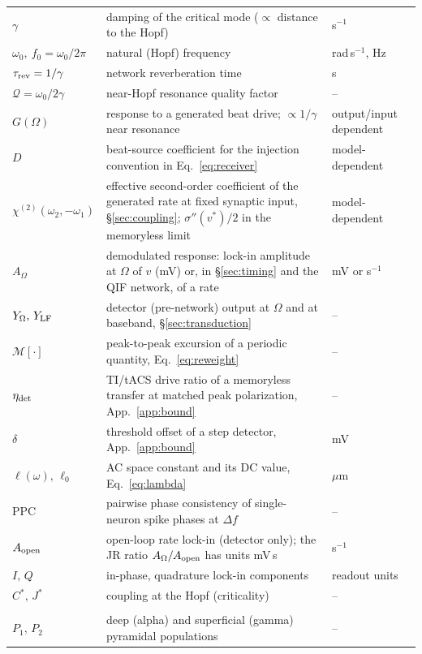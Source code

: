 \documentclass[11pt,a4paper]{article}
\newcommand{\Sig}{\sigma}
\begin{document}
{\begin{longtable}{@{}>{\raggedright\arraybackslash}p{} >{\raggedright\arraybackslash}p{} >{\raggedright\arraybackslash}p{}@{}}
$\gamma$ & damping of the critical mode ($\propto$ distance to the Hopf) & s$^{-1}$ \\
$\omega_0,\ f_0\!=\!\omega_0/2\pi$ & natural (Hopf) frequency & rad\,s$^{-1}$, Hz \\
$\tau_{\rm rev}=1/\gamma$ & network reverberation time & s \\
$\mathcal{Q}=\omega_0/2\gamma$ & near-Hopf resonance quality factor & -- \\
$G(\Omega)$ & response to a generated beat drive; $\propto1/\gamma$ near resonance & output/input dependent \\
$D$ & beat-source coefficient for the injection convention in Eq.~\eqref{eq:receiver} & model-dependent \\
$\chi^{(2)}(\omega_2,-\omega_1)$ & effective second-order coefficient of the generated rate at fixed synaptic input, \S\ref{sec:coupling}; $\Sig''(v^*)/2$ in the memoryless limit & model-dependent \\
$A_\Omega$ & demodulated response: lock-in amplitude at $\Omega$ of $v$ (mV) or, in \S\ref{sec:timing} and the QIF network, of a rate & mV or s$^{-1}$ \\
$Y_\Omega,\,Y_{\rm LF}$ & detector (pre-network) output at $\Omega$ and at baseband, \S\ref{sec:transduction} & -- \\
$\mathcal{M}[\cdot]$ & peak-to-peak excursion of a periodic quantity, Eq.~\eqref{eq:reweight} & -- \\
$\eta_{\rm det}$ & TI/tACS drive ratio of a memoryless transfer at matched peak polarization, App.~\ref{app:bound} & -- \\
$\delta$ & threshold offset of a step detector, App.~\ref{app:bound} & mV \\
$\ell(\omega),\,\ell_0$ & AC space constant and its DC value, Eq.~\eqref{eq:lambda} & $\mu$m \\
PPC & pairwise phase consistency of single-neuron spike phases at $\Delta f$ \cite{vinck2010} & -- \\
$A_{\rm open}$ & open-loop rate lock-in (detector only); the JR ratio $A_\Omega/A_{\rm open}$ has units mV\,s & s$^{-1}$ \\
$I,\,Q$ & in-phase, quadrature lock-in components & readout units \\
$C^{*},\,J^{*}$ & coupling at the Hopf (criticality) & -- \\
\midrule \multicolumn{3}{@{}l}{\textit{Laminar model (LaNMM)}} \\*
$P_1,\,P_2$ & deep (alpha) and superficial (gamma) pyramidal populations & -- \\

\end{longtable}}
\end{document}
